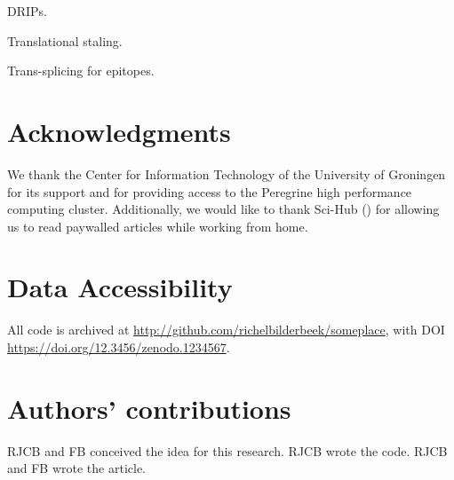 DRIPs.

Translational staling.

Trans-splicing for epitopes.


\section{Acknowledgments}

We thank the Center for Information Technology of the University 
of Groningen for its support and for providing access to the Peregrine 
high performance computing cluster. 
Additionally, we would like to thank Sci-Hub (\cite{himmelstein2018sci})
for allowing us to read paywalled articles while working from home.

\section{Data Accessibility}

All code is archived at \url{http://github.com/richelbilderbeek/someplace},
with DOI \url{https://doi.org/12.3456/zenodo.1234567}.

\section{Authors' contributions}

RJCB and FB conceived the idea for this research. 
RJCB wrote the code.
RJCB and FB wrote the article.





